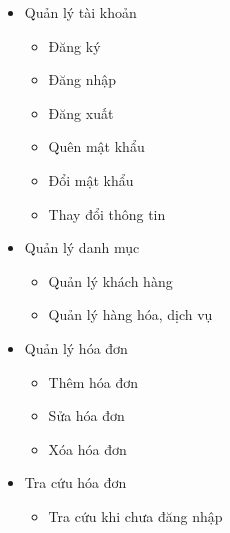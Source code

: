 \begin{itemize}

    \item Quản lý tài khoản

          \begin{itemize}

              \item Đăng ký

              \item Đăng nhập

              \item Đăng xuất

              \item Quên mật khẩu

              \item Đổi mật khẩu

              \item Thay đổi thông tin

          \end{itemize}

    \item Quản lý danh mục

          \begin{itemize}

              \item Quản lý khách hàng

              \item Quản lý hàng hóa, dịch vụ

          \end{itemize}

    \item Quản lý hóa đơn

          \begin{itemize}

              \item Thêm hóa đơn

              \item Sửa hóa đơn

              \item Xóa hóa đơn

          \end{itemize}

    \item Tra cứu hóa đơn

          \begin{itemize}

              \item Tra cứu khi chưa đăng nhập


\end{itemize}
\end{itemize}
